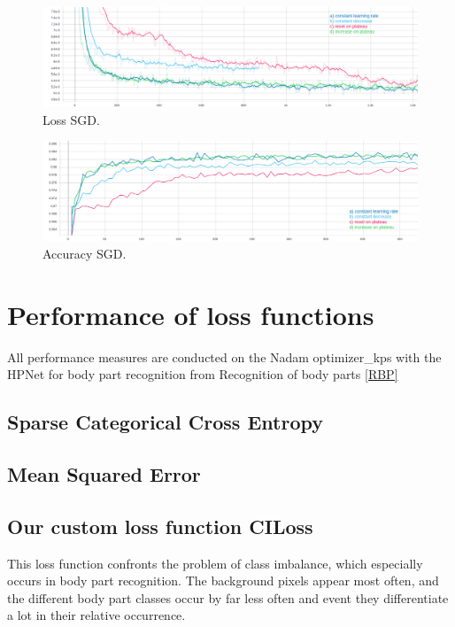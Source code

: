 \begin{figure}[H]
    \centering
    \includegraphics[width=\textwidth,height=\textheight,keepaspectratio]{img/loss_sgd.png}
    \decoRule
    \caption[Loss SGD]{Loss SGD.}
    \label{fig:sgd-loss}
\end{figure}

\begin{figure}[H]
    \centering
    \includegraphics[width=\textwidth,height=\textheight,keepaspectratio]{img/accuracy_sgd.png}
    \decoRule
    \caption[Accuracy SGD]{Accuracy SGD.}
    \label{fig:sgd-accuracy}
\end{figure}



\section{Performance of loss functions}
All performance measures are conducted on the Nadam optimizer\_kps with the HPNet for body part recognition from
Recognition of body parts \ref{RBP}

\subsection{Sparse Categorical Cross Entropy}

\subsection{Mean Squared Error}

\subsection{Our custom loss function CILoss}
This loss function confronts the problem of class imbalance, which especially occurs in body part recognition.
The background pixels appear most often, and the different body part classes occur by far less often and event they
differentiate a lot in their relative occurrence.

